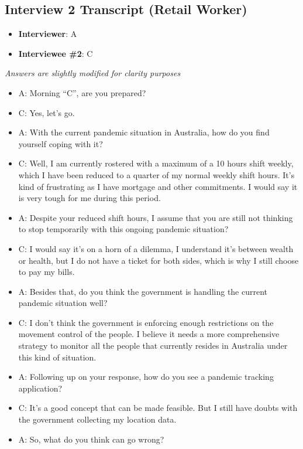 \begin{appendices}
      \subsection{Interview 2 Transcript (Retail Worker)}
      \begin{itemize}
        \item \textbf{Interviewer}: A
        \item \textbf{Interviewee \#2}: C
      \end{itemize}
      \par \textit{Answers are slightly modified for clarity purposes}

      \begin{itemize}
        \item A: Morning “C”, are you prepared?
        \item C: Yes, let’s go.
        \item A: With the current pandemic situation in Australia, how do you find yourself coping with it?
        \item C: Well, I am currently rostered with a maximum of a 10 hours shift weekly, which I have been
        reduced to a quarter of my normal weekly shift hours. It’s kind of frustrating as I have
        mortgage and other commitments. I would say it is very tough for me during this period.
        \item A: Despite your reduced shift hours, I assume that you are still not thinking to stop temporarily
        with this ongoing pandemic situation?
        \item C: I would say it’s on a horn of a dilemma, I understand it’s between wealth or health, but I do
        not have a ticket for both sides, which is why I still choose to pay my bills.
        \item A: Besides that, do you think the government is handling the current pandemic situation well?
        \item C: I don’t think the government is enforcing enough restrictions on the movement control of the
        people. I believe it needs a more comprehensive strategy to monitor all the people that
        currently resides in Australia under this kind of situation.
        \item A: Following up on your response, how do you see a pandemic tracking application?
        \item C: It’s a good concept that can be made feasible. But I still have doubts with the government
        collecting my location data.
        \item A: So, what do you think can go wrong?

\end{itemize}
\end{appendices}
